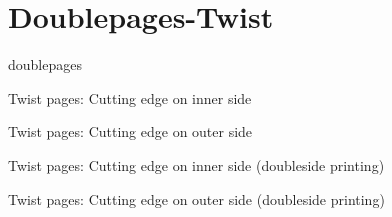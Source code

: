 \section{Doublepages-Twist}
\begingroup
doublepages

Twist pages: Cutting edge on inner side

Twist pages: Cutting edge on outer side

Twist pages: Cutting edge on inner side (doubleside printing)

Twist pages: Cutting edge on outer side (doubleside printing)

\endgroup


